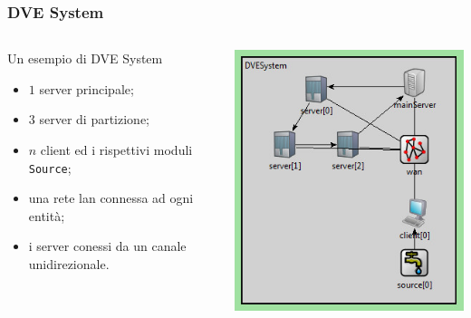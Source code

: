 \begin{frame}
\frametitle{DVE System}
\begin{columns}
\begin{column}{0.5\textwidth}
\begin{block}{Un esempio di DVE System}
\begin{itemize}
\item
$1$ server principale;
\item
$3$ server di partizione;
\item
$n$ client ed i rispettivi moduli \texttt{Source};
\item
una rete lan connessa ad ogni entità;
\item
i server conessi da un canale unidirezionale.
\end{itemize}
\end{block}
\end{column}
\begin{column}{0.5\textwidth}
\begin{center}
\includegraphics[scale=.45]{dvesystem.jpeg}
\end{center}
\end{column}
\end{columns}
\end{frame}

